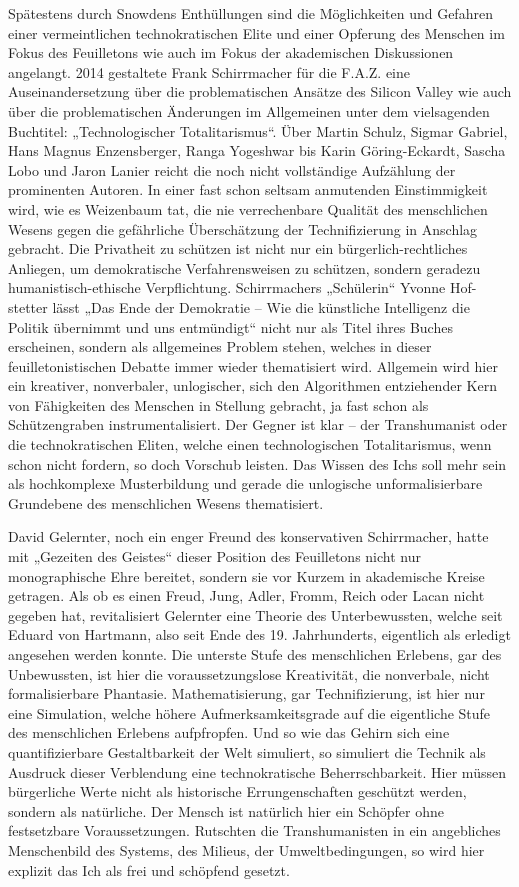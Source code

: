 \documentclass[a4paper,11pt]{article}
\begin{document}
Spätestens durch Snowdens Enthüllungen sind die Möglichkeiten und Gefahren
einer vermeintlichen technokratischen Elite und einer Opferung des Menschen
im Fokus des Feuilletons wie auch im Fokus der akademischen Diskussionen
angelangt. 2014 gestaltete Frank Schirrmacher für die F.A.Z. eine
Auseinandersetzung über die problematischen Ansätze des Silicon Valley wie
auch über die problematischen Änderungen im Allgemeinen unter dem vielsagenden
Buchtitel: „Technologischer Totalitarismus“. Über Martin Schulz, Sigmar
Gabriel, Hans Magnus Enzensberger, Ranga Yogeshwar bis Karin Göring-Eckardt,
Sascha Lobo und Jaron Lanier reicht die noch nicht vollständige Aufzählung
der prominenten Autoren. In einer fast schon seltsam anmutenden Einstimmigkeit
wird, wie es Weizenbaum tat, die nie verrechenbare Qualität des menschlichen
Wesens gegen die gefährliche Überschätzung der Technifizierung in Anschlag
gebracht. Die Privatheit zu schützen ist nicht nur ein bürgerlich-rechtliches
Anliegen, um demokratische Verfahrensweisen zu schützen, sondern geradezu
humanistisch-ethische Verpflichtung. Schirrmachers „Schülerin“ Yvonne
Hof-stetter lässt „Das Ende der Demokratie – Wie die künstliche Intelligenz
die Politik übernimmt und uns entmündigt“ nicht nur als Titel ihres Buches
erscheinen, sondern als allgemeines Problem stehen, welches in dieser
feuilletonistischen Debatte immer wieder thematisiert wird. Allgemein wird
hier ein kreativer, nonverbaler, unlogischer, sich den Algorithmen
entziehender Kern von Fähigkeiten des Menschen in Stellung gebracht, ja fast
schon als Schützengraben instrumentalisiert. Der Gegner ist klar – der
Transhumanist oder die technokratischen Eliten, welche einen technologischen
Totalitarismus, wenn schon nicht fordern, so doch Vorschub leisten. Das Wissen
des Ichs soll mehr sein als hochkomplexe Musterbildung und gerade die
unlogische unformalisierbare Grundebene des menschlichen Wesens thematisiert.

David Gelernter, noch ein enger Freund des konservativen Schirrmacher, hatte
mit „Gezeiten des Geistes“ dieser Position des Feuilletons nicht nur
monographische Ehre bereitet, sondern sie vor Kurzem in akademische Kreise
getragen. Als ob es einen Freud, Jung, Adler, Fromm, Reich oder Lacan nicht
gegeben hat, revitalisiert Gelernter eine Theorie des Unterbewussten, welche
seit Eduard von Hartmann, also seit Ende des 19. Jahrhunderts, eigentlich als
erledigt angesehen werden konnte. Die unterste Stufe des menschlichen
Erlebens, gar des Unbewussten, ist hier die voraussetzungslose Kreativität,
die nonverbale, nicht formalisierbare Phantasie. Mathematisierung, gar
Technifizierung, ist hier nur eine Simulation, welche höhere
Aufmerksamkeitsgrade auf die eigentliche Stufe des menschlichen Erlebens
aufpfropfen. Und so wie das Gehirn sich eine quantifizierbare Gestaltbarkeit
der Welt simuliert, so simuliert die Technik als Ausdruck dieser Verblendung
eine technokratische Beherrschbarkeit. Hier müssen bürgerliche Werte nicht als
historische Errungenschaften geschützt werden, sondern als natürliche. Der
Mensch ist natürlich hier ein Schöpfer ohne festsetzbare Voraussetzungen.
Rutschten die Transhumanisten in ein angebliches Menschenbild des Systems, des
Milieus, der Umweltbedingungen, so wird hier explizit das Ich als frei und
schöpfend gesetzt.
\end{document}
